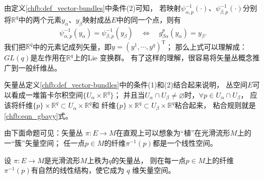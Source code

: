 由定义\ref{chfb:def_vector-bundles}中条件(2)可知，
若映射$\psi^{-1}_{\alpha,p}(\cdot)$、$\psi^{-1}_{\beta,p}(\cdot)$分别
将$\mathbb{R}^q$中的两个元素$y_\alpha$、$y_\beta$映射成丛$E$中的同一个点，则有
\begin{equation}\label{chfb:eqn_gbayy}
    \psi^{-1}_{\alpha,p}(y_\alpha) = \psi^{-1}_{\beta,p}(y_\beta)
    \quad \Leftrightarrow \quad
    g^p_{\beta \alpha}(y_\alpha) = y_\beta .
\end{equation}
我们把$\mathbb{R}^q$中的元素记成列矢量，即$y=(y^1,\cdots, y^q)^{\mathrm{T}}$；
那么上式可以理解成：$GL(q)$是左作用在$\mathbb{R}^q$上的Lie 变换群。
有了这样的理解，很容易将矢量丛概念推广到一般纤维丛。

矢量丛定义\ref{chfb:def_vector-bundles}中的条件(1)和(2)结合起来说明，
丛空间$E$可以看成一堆笛卡尔积空间$\{U_\alpha \times \mathbb{R}^q\}$；
并且当$U_\alpha \cap U_\beta \neq \varnothing$时，$\forall p\in U_\alpha \cap U_\beta$，
应该将纤维$\{p\}\times \mathbb{R}^q \subset U_\alpha \times \mathbb{R}^q$和
纤维$\{p\}\times \mathbb{R}^q \subset U_\beta \times \mathbb{R}^q$粘合起来，
粘合规则就是\eqref{chfb:eqn_gbayy}式。

由下面命题可见：矢量丛 $\pi: E \to M$在直观上可以想象为“植”在光滑流形$M$上的一“簇”矢量空间；
任一点$p\in M$的纤维$\pi^{-1}(p)$都是一个线性空间。

\begin{proposition}\label{chfb:thm_linear-space}
设 $\pi: E \rightarrow M$是光滑流形$M$上秩为$q$的矢量丛，
则在每一点$p \in M$上的纤维 $\pi^{-1}(p)$有自然的线性结构，使它成为 $q$ 维矢量空间。
\end{proposition}


